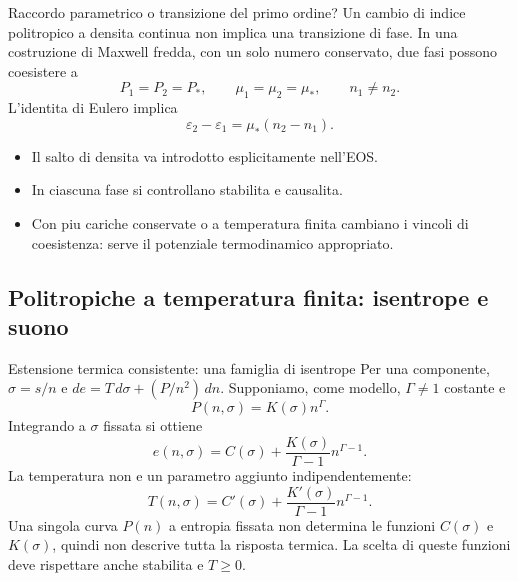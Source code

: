 \begin{frame}[t]{Raccordo parametrico o transizione del primo ordine?}
\vspace*{3mm}
\small
Un cambio di indice politropico a densita continua non implica
una transizione di fase.
\smallskip
In una costruzione di Maxwell fredda, con un solo numero conservato,
due fasi possono coesistere a
\[
P_1=P_2=P_*,\qquad \mu_1=\mu_2=\mu_*,\qquad n_1\ne n_2.
\]
L'identita di Eulero implica
\[
\boxed{\varepsilon_2-\varepsilon_1=\mu_*(n_2-n_1).}
\]
\begin{itemize}
\item Il salto di densita va introdotto esplicitamente nell'EOS.
\item In ciascuna fase si controllano stabilita e causalita.
\item Con piu cariche conservate o a temperatura finita cambiano i
vincoli di coesistenza: serve il potenziale termodinamico appropriato.
\end{itemize}
\end{frame}

\subsection{Politropiche a temperatura finita: isentrope e suono}

\begin{frame}[t]{Estensione termica consistente: una famiglia di isentrope}
\vspace*{3mm}
\small
Per una componente, $\sigma=s/n$ e $de=T\,d\sigma+(P/n^2)\,dn$.
Supponiamo, come modello, $\Gamma\ne1$ costante e
\[
P(n,\sigma)=K(\sigma)n^\Gamma.
\]
Integrando a $\sigma$ fissata si ottiene
\[
\boxed{e(n,\sigma)=C(\sigma)+
\frac{K(\sigma)}{\Gamma-1}n^{\Gamma-1}.}
\]
La temperatura non e un parametro aggiunto indipendentemente:
\[
\boxed{T(n,\sigma)=C'(\sigma)+
\frac{K'(\sigma)}{\Gamma-1}n^{\Gamma-1}.}
\]
Una singola curva $P(n)$ a entropia fissata non determina le funzioni
$C(\sigma)$ e $K(\sigma)$, quindi non descrive tutta la risposta termica.
La scelta di queste funzioni deve rispettare anche stabilita e $T\ge0$.
\end{frame}

